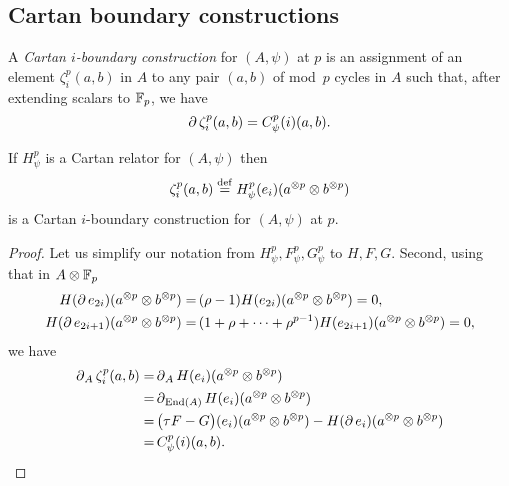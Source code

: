 \subsection{Cartan boundary constructions}\label{ss:cartan_coboundary}

\begin{definition}
	A \textit{Cartan $i$-boundary construction} for $(A,\psi)$ at $p$ is an assignment of an element $\zeta_i^p(a,b)$ in $A$ to any pair $(a,b)$ of mod~$p$ cycles in $A$ such that, after extending scalars to ${\mathbb{F}_p}$, we have
	\[
	\operatorname{\partial} \zeta_i^p(a,b) = C_\psi^p(i)(a, b).
	\]
\end{definition}

\begin{theorem}
	If $H_\psi^p$ is a Cartan relator for $(A, \psi)$ then
	\[
	\zeta_i^p(a,b) \stackrel{\mathrm{def}}{=} H_\psi^p(e_i)(a^{\otimes p} \otimes b^{\otimes p})
	\]
	is a Cartan $i$-boundary construction for $(A, \psi)$ at $p$.
\end{theorem}

\begin{proof}
	Let us simplify our notation from $H_\psi^p, F_\psi^p, G_\psi^p$ to $H, F, G$.
	Second, using that in $A \otimes {\mathbb{F}_p}$
	\begin{align*}
		H(\operatorname{\partial} e_{2i})(a^{\otimes p} \otimes b^{\otimes p}) =&\,
		(\rho - 1) H(e_{2i})(a^{\otimes p} \otimes b^{\otimes p}) = 0, \\
		H(\operatorname{\partial} e_{2i+1})(a^{\otimes p} \otimes b^{\otimes p}) =&\,
		(1+\rho+\dots+\rho^{p-1}) H(e_{2i+1})(a^{\otimes p} \otimes b^{\otimes p}) = 0,
	\end{align*}
	we have
	\begin{align*}
		\operatorname{\partial}_A \zeta_i^p(a,b) =&
		\operatorname{\partial}_A H(e_i)(a^{\otimes p} \otimes b^{\otimes p}) \\ =&
		\operatorname{\partial}_{\mathrm{End}(A)} H(e_i)(a^{\otimes p} \otimes b^{\otimes p}) \\ =& \,
		\big(\tau F - G\big)(e_i)(a^{\otimes p} \otimes b^{\otimes p}) -
		H(\operatorname{\partial} e_i)(a^{\otimes p} \otimes b^{\otimes p}) \\ =&\,
		C^p_\psi(i)(a,b).\qedhere
	\end{align*}
\end{proof}